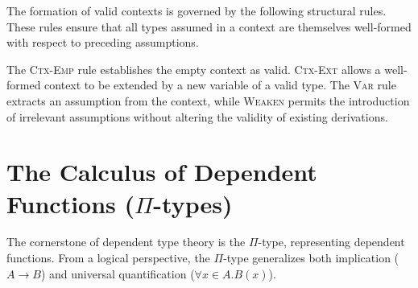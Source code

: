 \begin{definition}
The formation of valid contexts is governed by the following structural rules. These rules ensure that all types assumed in a context are themselves well-formed with respect to preceding assumptions.
\begin{mathpar}



\end{mathpar}
The \textsc{Ctx-Emp} rule establishes the empty context as valid. \textsc{Ctx-Ext} allows a well-formed context to be extended by a new variable of a valid type. The \textsc{Var} rule extracts an assumption from the context, while \textsc{Weaken} permits the introduction of irrelevant assumptions without altering the validity of existing derivations.
\end{definition}

\section{The Calculus of Dependent Functions ($\Pi$-types)}

The cornerstone of dependent type theory is the $\Pi$-type, representing dependent functions. From a logical perspective, the $\Pi$-type generalizes both implication ($A \to B$) and universal quantification ($\forall x{\in}A. B(x)$).

